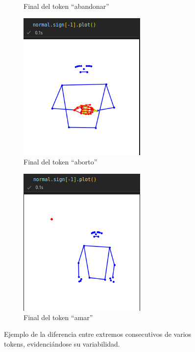 \begin{figure}[t]
\begin{subfigure}[t]{0.3\textwidth}
		\caption{Final del token ``abandonar''}
		\label{f:final_variable_abandonar}
	\end{subfigure}
	\begin{subfigure}[t]{0.3\textwidth}
		\centering
		\includegraphics[align=t,width=0.9\linewidth, height =0.9\linewidth]{Graphics/final_aborto.png}
		\caption{Final del token ``aborto''}
		\label{f:final_variable_aborto}
	\end{subfigure}
	\begin{subfigure}[t]{0.3\textwidth}
		\centering
		\includegraphics[align=t,width=0.9\linewidth, height =0.9\linewidth]{Graphics/final_amar.png}
		\caption{Final del token ``amar''}
		\label{f:final_variable_amar}
	\end{subfigure}
	
	\caption{Ejemplo de la diferencia entre extremos consecutivos de varios tokens, evidenciándose su variabilidad.}
	\label{f:fluidez_variable}
\end{figure}
